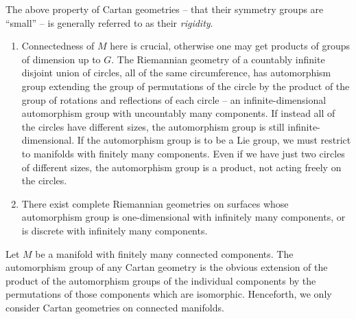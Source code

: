 The above property of Cartan geometries -- that their symmetry groups are ``small'' -- is generally referred to as their \emph{rigidity}.

\begin{example}
    \begin{enumerate}
        \item Connectedness of $M$ here is crucial, otherwise one may get products of groups of dimension up to $G$. The Riemannian geometry of a countably infinite disjoint union of circles, all of the same circumference, has automorphism group extending the group of permutations of the circle by the product of the group of rotations and reflections of each circle -- an infinite-dimensional automorphism group with uncountably many components. If instead all of the circles have different sizes, the automorphism group is still infinite-dimensional. If the automorphism group is to be a Lie group, we must restrict to manifolds with finitely many components. Even if we have just two circles of different sizes, the automorphism group is a product, not acting freely on the circles.
        \item There exist complete Riemannian geometries on surfaces whose automorphism group is one-dimensional with infinitely many components, or is discrete with infinitely many components.
    \end{enumerate}
\end{example}

\begin{example}
    Let $M$ be a manifold with finitely many connected components. The automorphism group of any Cartan geometry is the obvious extension of the product of the automorphism groups of the individual components by the permutations of those components which are isomorphic. Henceforth, we only consider Cartan geometries on connected manifolds.
\end{example}

